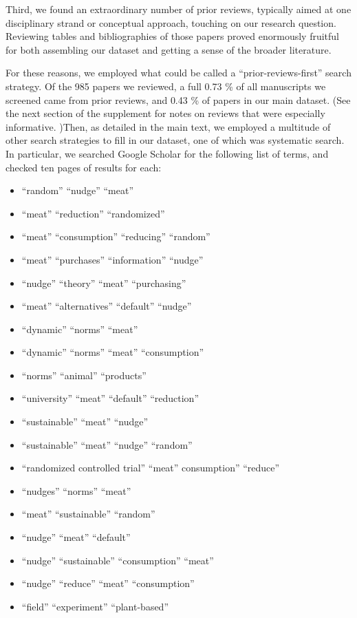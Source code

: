 \documentclass[sn-nature,referee,pdflatex]{sn-jnl}
\providecommand{\tightlist}{%
  \setlength{\itemsep}{0pt}\setlength{\parskip}{0pt}}
\begin{document}
Third, we found an extraordinary number of prior reviews, typically
aimed at one disciplinary strand or conceptual approach, touching on our
research question. Reviewing tables and bibliographies of those papers
proved enormously fruitful for both assembling our dataset and getting a
sense of the broader literature.

For these reasons, we employed what could be called a
``prior-reviews-first'' search strategy. Of the 985 papers we reviewed,
a full 0.73 \% of all manuscripts we screened came from prior reviews,
and 0.43 \% of papers in our main dataset. (See the next section of the
supplement for notes on reviews that were especially informative. )Then,
as detailed in the main text, we employed a multitude of other search
strategies to fill in our dataset, one of which was systematic search.
In particular, we searched Google Scholar for the following list of
terms, and checked ten pages of results for each:

\begin{itemize}
\tightlist
\item
  ``random'' ``nudge'' ``meat''
\item
  ``meat'' ``reduction'' ``randomized''
\item
  ``meat'' ``consumption'' ``reducing'' ``random''
\item
  ``meat'' ``purchases'' ``information'' ``nudge''
\item
  ``nudge'' ``theory'' ``meat'' ``purchasing''
\item
  ``meat'' ``alternatives'' ``default'' ``nudge''
\item
  ``dynamic'' ``norms'' ``meat''
\item
  ``dynamic'' ``norms'' ``meat'' ``consumption''
\item
  ``norms'' ``animal'' ``products''
\item
  ``university'' ``meat'' ``default'' ``reduction''
\item
  ``sustainable'' ``meat'' ``nudge''
\item
  ``sustainable'' ``meat'' ``nudge'' ``random''
\item
  ``randomized controlled trial'' ``meat'' consumption'' ``reduce''
\item
  ``nudges'' ``norms'' ``meat''
\item
  ``meat'' ``sustainable'' ``random''
\item
  ``nudge'' ``meat'' ``default''
\item
  ``nudge'' ``sustainable'' ``consumption'' ``meat''
\item
  ``nudge'' ``reduce'' ``meat'' ``consumption''
\item
  ``field'' ``experiment'' ``plant-based''
\end{itemize}
\end{document}

